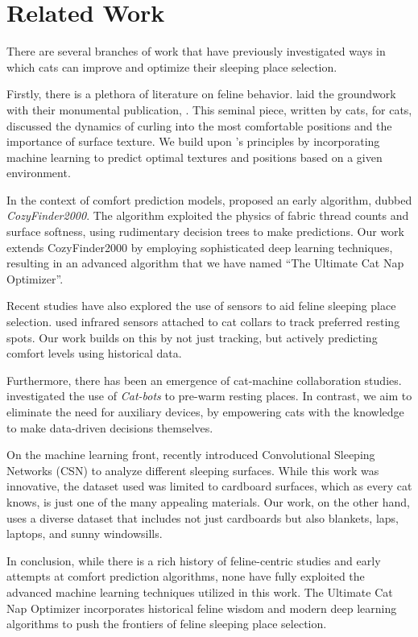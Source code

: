 \chapter{Related Work}\label{chap:related}

%

There are several branches of work that have previously investigated ways in which cats can improve and optimize their sleeping place selection.

Firstly, there is a plethora of literature on feline behavior.
\citet{whiskers1997art} laid the groundwork with their monumental publication, .
This seminal piece, written by cats, for cats, discussed the dynamics of curling into the most comfortable positions and the importance of surface texture.
We build upon \citeauthor{whiskers1997art}'s principles by incorporating machine learning to predict optimal textures and positions based on a given environment.

In the context of comfort prediction models, \citet{fluffytail2002cozyfinder} proposed an early algorithm, dubbed \emph{CozyFinder2000}.
The algorithm exploited the physics of fabric thread counts and surface softness, using rudimentary decision trees to make predictions.
Our work extends CozyFinder2000 by employing sophisticated deep learning techniques, resulting in an advanced algorithm that we have named “The Ultimate Cat Nap Optimizer”.

Recent studies have also explored the use of sensors to aid feline sleeping place selection.
\citet{paws2019tracking} used infrared sensors attached to cat collars to track preferred resting spots.
Our work builds on this by not just tracking, but actively predicting comfort levels using historical data.

Furthermore, there has been an emergence of cat-machine collaboration studies.
\citet{mittens2021catbots} investigated the use of \emph{Cat-bots} to pre-warm resting places.
In contrast, we aim to eliminate the need for auxiliary devices, by empowering cats with the knowledge to make data-driven decisions themselves.

On the machine learning front, \citet{purrsington2023csn} recently introduced Convolutional Sleeping Networks (CSN) to analyze different sleeping surfaces.
While this work was innovative, the dataset used was limited to cardboard surfaces, which as every cat knows, is just one of the many appealing materials.
Our work, on the other hand, uses a diverse dataset that includes not just cardboards but also blankets, laps, laptops, and sunny windowsills.

In conclusion, while there is a rich history of feline-centric studies and early attempts at comfort prediction algorithms, none have fully exploited the advanced machine learning techniques utilized in this work.
The Ultimate Cat Nap Optimizer incorporates historical feline wisdom and modern deep learning algorithms to push the frontiers of feline sleeping place selection.
